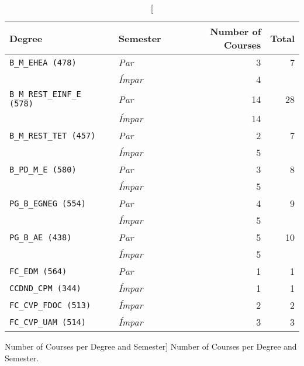 \begin{table}[h!]
    \centering

    \begin{tabular}{| l | l | r | r |}
        \hline
        Degree                             & Semester       & Number of Courses & Total \\ \hline
        \texttt{B\_M\_EHEA (478)}          & \textit{Par}   & 3                 & 7     \\
                                           & \textit{Ímpar} & 4                 &       \\ \hline
        \texttt{B\_M\_REST\_EINF\_E (578)} & \textit{Par}   & 14                & 28    \\
                                           & \textit{Ímpar} & 14                &       \\ \hline
        \texttt{B\_M\_REST\_TET (457)}     & \textit{Par}   & 2                 & 7     \\
                                           & \textit{Ímpar} & 5                 &       \\ \hline
        \texttt{B\_PD\_M\_E (580)}         & \textit{Par}   & 3                 & 8     \\
                                           & \textit{Ímpar} & 5                 &       \\ \hline
        \texttt{PG\_B\_EGNEG (554)}        & \textit{Par}   & 4                 & 9     \\
                                           & \textit{Ímpar} & 5                 &       \\ \hline
        \texttt{PG\_B\_AE (438)}           & \textit{Par}   & 5                 & 10    \\
                                           & \textit{Ímpar} & 5                 &       \\ \hline
        \texttt{FC\_EDM (564)}             & \textit{Par}   & 1                 & 1     \\ \hline
        \texttt{CCDND\_CPM (344)}          & \textit{Ímpar} & 1                 & 1     \\ \hline
        \texttt{FC\_CVP\_FDOC (513)}       & \textit{Ímpar} & 2                 & 2     \\ \hline
        \texttt{FC\_CVP\_UAM (514)}        & \textit{Ímpar} & 3                 & 3     \\ \hline
    \end{tabular}

    \caption
        [Number of Courses per Degree and Semester]
        {Number of Courses per Degree and Semester.}

    \label{tab:stat_003_res}
\end{table}

